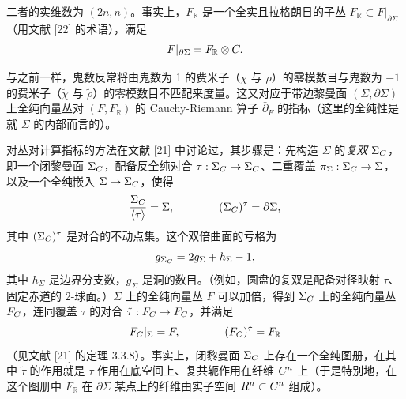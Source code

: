 
二者的实维数为 $(2n,n)$。事实上，$F_{\mathbb R}$ 是一个全实且拉格朗日的子丛 $F_{\mathbb R}\subset F|_{\partial\Sigma}$（用文献 [22] 的术语），满足
\[
F|_{\partial\Sigma}=F_{\mathbb R}\otimes C .
\]


与之前一样，鬼数反常将由鬼数为 1 的费米子（$\chi$ 与 $\rho$）的零模数目与鬼数为 $-1$ 的费米子（$\tilde\chi$ 与 $\tilde\rho$）的零模数目不匹配来度量。这又对应于带边黎曼面 $(\Sigma,\partial\Sigma)$ 上全纯向量丛对 $(F,F_{\mathbb R})$ 的 Cauchy-Riemann 算子 $\bar\partial_F$ 的指标（这里的全纯性是就 $\Sigma$ 的内部而言的）。

对丛对计算指标的方法在文献 [21] 中讨论过，其步骤是：先构造 $\Sigma$ 的\emph{复双} $\Sigma_{C}$，即一个闭黎曼面 $\Sigma_{C}$，配备反全纯对合 $\tau:\Sigma_{C}\to\Sigma_{C}$、二重覆盖 $\pi_\Sigma:\Sigma_{C}\to\Sigma$，以及一个全纯嵌入 $\Sigma\to\Sigma_{C}$，使得
\[
\frac{\Sigma_{C}}{\langle\tau\rangle}=\Sigma,
\qquad\qquad
(\Sigma_{C})^\tau=\partial\Sigma,
\]
其中 $(\Sigma_{C})^\tau$ 是对合的不动点集。这个双倍曲面的亏格为
\[
g_{\Sigma_{C}}=2g_\Sigma+h_\Sigma-1,
\]
其中 $h_\Sigma$ 是边界分支数，$g_\Sigma$ 是洞的数目。（例如，圆盘的复双是配备对径映射 $\tau$、固定赤道的 2-球面。）$\Sigma$ 上的全纯向量丛 $F$ 可以加倍，得到 $\Sigma_{C}$ 上的全纯向量丛 $F_{C}$，连同覆盖 $\tau$ 的对合 $\tilde\tau:F_{C}\to F_{C}$，并满足
\[
F_{C}|_\Sigma=F,
\qquad\qquad
(F_{C})^{\tilde\tau}=F_{\mathbb R}
\]
（见文献 [21] 的定理 3.3.8）。事实上，闭黎曼面 $\Sigma_{C}$ 上存在一个全纯图册，在其中 $\tilde\tau$ 的作用就是 $\tau$ 作用在底空间上、复共轭作用在纤维 $C^n$ 上（于是特别地，在这个图册中 $F_{\mathbb R}$ 在 $\partial\Sigma$ 某点上的纤维由实子空间 $R^n\subset C^n$ 组成）。


